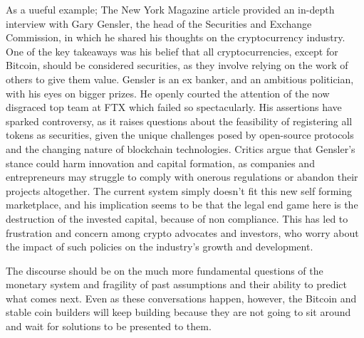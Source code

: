 As a uueful example; The New York Magazine article provided an in-depth interview with Gary Gensler, the head of the Securities and Exchange Commission, in which he shared his thoughts on the cryptocurrency industry. One of the key takeaways was his belief that all cryptocurrencies, except for Bitcoin, should be considered securities, as they involve relying on the work of others to give them value. Gensler is an ex banker, and an ambitious politician, with his eyes on bigger prizes. He openly courted the attention of the now disgraced top team at FTX which failed so spectacularly. His assertions have sparked controversy, as it raises questions about the feasibility of registering all tokens as securities, given the unique challenges posed by open-source protocols and the changing nature of blockchain technologies. Critics argue that Gensler's stance could harm innovation and capital formation, as companies and entrepreneurs may struggle to comply with onerous regulations or abandon their projects altogether. The current system simply doesn't fit this new self forming marketplace, and his implication seems to be that the legal end game here is the destruction of the invested capital, because of non compliance. This has led to frustration and concern among crypto advocates and investors, who worry about the impact of such policies on the industry's growth and development.\par
The discourse should be on the much more fundamental questions of the monetary system and fragility of past assumptions and their ability to predict what comes next. Even as these conversations happen, however, the Bitcoin and stable coin builders will keep building because they are not going to sit around and wait for solutions to be presented to them.
